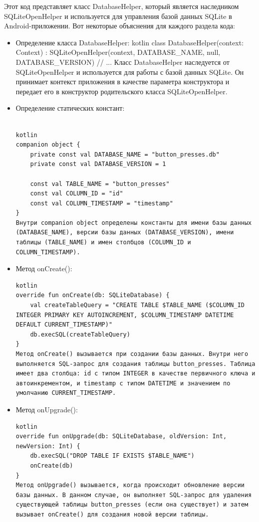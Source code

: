 \documentclass[12pt]{article}
\begin{document}
    Этот код представляет класс DatabaseHelper, который является наследником SQLiteOpenHelper и используется для управления базой данных SQLite в Android-приложении. Вот некоторые объяснения для каждого раздела кода:

    \begin{itemize}

        \item Определение класса DatabaseHelper:
        kotlin
        class DatabaseHelper(context: Context) : SQLiteOpenHelper(context, DATABASE_NAME, null, DATABASE_VERSION) {
            // ...
        }
        Класс DatabaseHelper наследуется от SQLiteOpenHelper и используется для работы с базой данных SQLite. Он принимает контекст приложения в качестве параметра конструктора и передает его в конструктор родительского класса SQLiteOpenHelper.

        \item Определение статических констант:
        \begin{verbatim}

kotlin
companion object {
    private const val DATABASE_NAME = "button_presses.db"
    private const val DATABASE_VERSION = 1

    const val TABLE_NAME = "button_presses"
    const val COLUMN_ID = "id"
    const val COLUMN_TIMESTAMP = "timestamp"
}
Внутри companion object определены константы для имени базы данных (DATABASE_NAME), версии базы данных (DATABASE_VERSION), имени таблицы (TABLE_NAME) и имен столбцов (COLUMN_ID и COLUMN_TIMESTAMP).
        \end{verbatim}


        \item Метод onCreate():
        \begin{verbatim}
kotlin
override fun onCreate(db: SQLiteDatabase) {
    val createTableQuery = "CREATE TABLE $TABLE_NAME ($COLUMN_ID INTEGER PRIMARY KEY AUTOINCREMENT, $COLUMN_TIMESTAMP DATETIME DEFAULT CURRENT_TIMESTAMP)"
    db.execSQL(createTableQuery)
}
Метод onCreate() вызывается при создании базы данных. Внутри него выполняется SQL-запрос для создания таблицы button_presses. Таблица имеет два столбца: id с типом INTEGER в качестве первичного ключа и автоинкрементом, и timestamp с типом DATETIME и значением по умолчанию CURRENT_TIMESTAMP.
        \end{verbatim}

        \item Метод onUpgrade():
        \begin{verbatim}
kotlin
override fun onUpgrade(db: SQLiteDatabase, oldVersion: Int, newVersion: Int) {
    db.execSQL("DROP TABLE IF EXISTS $TABLE_NAME")
    onCreate(db)
}
Метод onUpgrade() вызывается, когда происходит обновление версии базы данных. В данном случае, он выполняет SQL-запрос для удаления существующей таблицы button_presses (если она существует) и затем вызывает onCreate() для создания новой версии таблицы.
        \end{verbatim}


\end{itemize}
\end{document}
